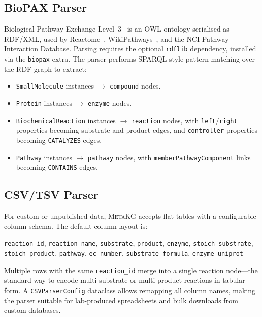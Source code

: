 \documentclass[10pt]{article}
\begin{document}
\subsection{BioPAX Parser}

Biological Pathway Exchange Level~3~\citep{demir2010biopax} is an OWL
ontology serialised as RDF/XML, used by Reactome~\citep{jassal2020reactome},
WikiPathways~\citep{martens2021wikipathways}, and the NCI Pathway Interaction
Database. Parsing requires the optional \texttt{rdflib} dependency, installed
via the \texttt{biopax} extra. The parser performs SPARQL-style pattern
matching over the RDF graph to extract:

\begin{itemize}[leftmargin=*,itemsep=2pt]
  \item \texttt{SmallMolecule} instances $\to$ \texttt{compound} nodes.
  \item \texttt{Protein} instances $\to$ \texttt{enzyme} nodes.
  \item \texttt{BiochemicalReaction} instances $\to$ \texttt{reaction} nodes,
    with \texttt{left}/\texttt{right} properties becoming substrate and
    product edges, and \texttt{controller} properties becoming
    \texttt{CATALYZES} edges.
  \item \texttt{Pathway} instances $\to$ \texttt{pathway} nodes, with
    \texttt{memberPathwayComponent} links becoming \texttt{CONTAINS} edges.
\end{itemize}

\subsection{CSV/TSV Parser}

For custom or unpublished data, \textsc{MetaKG} accepts flat tables with a
configurable column schema. The default column layout is:

\begin{center}
\small
\texttt{reaction\_id}, \texttt{reaction\_name}, \texttt{substrate},
\texttt{product}, \texttt{enzyme}, \texttt{stoich\_substrate},
\texttt{stoich\_product}, \texttt{pathway}, \texttt{ec\_number},
\texttt{substrate\_formula}, \texttt{enzyme\_uniprot}
\end{center}

Multiple rows with the same \texttt{reaction\_id} merge into a single
reaction node---the standard way to encode multi-substrate or multi-product
reactions in tabular form. A \texttt{CSVParserConfig} dataclass allows
remapping all column names, making the parser suitable for lab-produced
spreadsheets and bulk downloads from custom databases.



\end{document}
